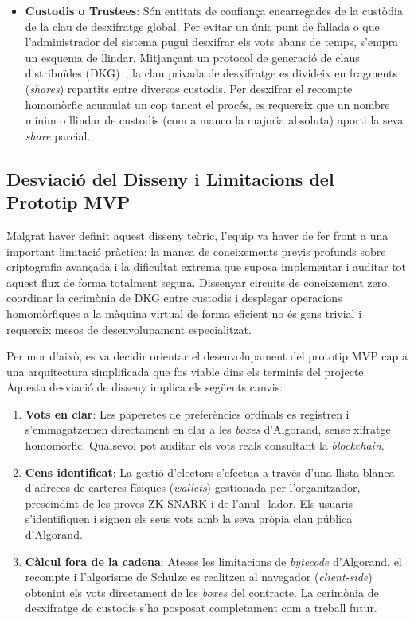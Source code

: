 \begin{itemize}
    \item \textbf{Custodis o Trustees}: Són entitats de confiança encarregades de la custòdia de la clau de desxifratge
    global.
    Per evitar un únic punt de fallada o que l'administrador del sistema pugui desxifrar els vots abans de temps,
    s'empra un esquema de llindar.
    Mitjançant un protocol de generació de claus distribuïdes (DKG)~\cite{gennaro1999dkg}, la clau privada de desxifratge es divideix en
    fragments (\textit{shares}) repartits entre diversos custodis.
    Per desxifrar el recompte homomòrfic acumulat un cop tancat el procés, es requereix que un nombre mínim o llindar de
    custodis (com a manco la majoria absoluta) aporti la seva \textit{share} parcial.
\end{itemize}

\subsection{Desviació del Disseny i Limitacions del Prototip MVP}
\label{subsec:desviacio-mvp}

Malgrat haver definit aquest disseny teòric, l'equip va haver de fer front a una important limitació pràctica: la manca
de coneixements previs profunds sobre criptografia avançada i la dificultat extrema que suposa implementar i auditar tot
aquest flux de forma totalment segura.
Dissenyar circuits de coneixement zero, coordinar la cerimònia de DKG entre custodis i desplegar operacions
homomòrfiques a la màquina virtual de forma eficient no és gens trivial i requereix mesos de desenvolupament
especialitzat.

Per mor d'això, es va decidir orientar el desenvolupament del prototip \ac{MVP} cap a una arquitectura simplificada que
fos viable dins els terminis del projecte.
Aquesta desviació de disseny implica els següents canvis:

\begin{enumerate}
    \item \textbf{Vots en clar}: Les paperetes de preferències ordinals es registren i s'emmagatzemen directament en
    clar a les \textit{boxes} d'Algorand, sense xifratge homomòrfic.
    Qualsevol pot auditar els vots reals consultant la \textit{blockchain}.

    \item \textbf{Cens identificat}: La gestió d'electors s'efectua a través d'una llista blanca d'adreces de carteres
    físiques (\textit{wallets}) gestionada per l'organitzador, prescindint de les proves \ac{ZK-SNARK} i de
    l'anul·lador.
    Els usuaris s'identifiquen i signen els seus vots amb la seva pròpia clau pública d'Algorand.

    \item \textbf{Càlcul fora de la cadena}: Ateses les limitacions de \textit{bytecode} d'Algorand, el recompte i
    l'algorisme de Schulze es realitzen al navegador (\textit{client-side}) obtenint els vots directament de les
    \textit{boxes} del contracte.
    La cerimònia de desxifratge de custodis s'ha posposat completament com a treball futur.
\end{enumerate}

